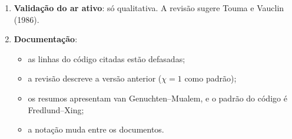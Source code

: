 \begin{enumerate}
\begin{itemize}
      \item D17: o ar na superfície alagada;
      \item D19: a norma da massa no critério de convergência;
      \item $p_a$ quando $S_a \to 0$;
      \item o teste de Taylor com $\chi = S_e$;
      \item a classe Mohr--Coulomb antiga, ainda instanciada.
    \end{itemize}
  \item \textbf{Validação do ar ativo}: só qualitativa. A revisão sugere Touma e Vauclin (1986).
  \item \textbf{Documentação}:
    \begin{itemize}
      \item as linhas do código citadas estão defasadas;
      \item a revisão descreve a versão anterior ($\chi = 1$ como padrão);
      \item os resumos apresentam van Genuchten--Mualem, e o padrão do código é Fredlund--Xing;
      \item a notação muda entre os documentos.
    \end{itemize}
\end{enumerate}
